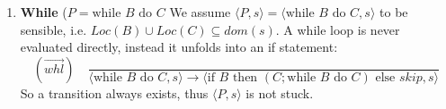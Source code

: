 \begin{solution}
\begin{enumerate}
\begin{enumerate}
\begin{enumerate}
\begin{enumerate}
                    \item $B = true$, then we can apply 
                     \[ (\overset{\rightarrow}{if2}) \quad \frac{}{\langle \text{if }true \text{ then }C_1 \text{ else }C_2, s\rangle \to \langle C_1,s\rangle}\]
                    \item $B = false$, then we can apply \[ (\overset{\rightarrow}{if3}) \quad \frac{}{\langle \text{if }false \text{ then }C_1 \text{ else }C_2, s\rangle \to \langle C_2,s\rangle}\]
                \end{enumerate}
                Hence in all cases a transition exists, therefore $\langle P,s\rangle $ is not stuck.


                   \item \textbf{While} ($P=\text{while }B \text{ do } C$
                We assume $\langle P,s\rangle = \langle \text{while }B \text{ do } C, s \rangle$ to be sensible, i.e. $Loc(B) \cup Loc(C)  \subseteq dom(s)$.
                A while loop is never evaluated directly, instead it unfolds into an if statement: 
                \[ (\overset{\rightarrow}{whl}) \quad \frac{}{\langle \text{while }B \text{ do } C, s\rangle \to \langle \text{if }B \text{ then }(C;\text{while }B \text{ do } C) \text{ else }skip, s\rangle}\]
                So a transition always exists, thus  $\langle P,s\rangle $ is not stuck.
                \end{enumerate}


\end{enumerate}
\end{enumerate}
\end{solution}
